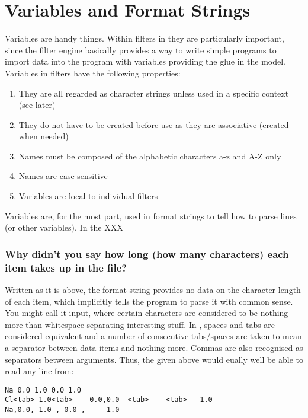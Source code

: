 \chapter{Variables and Format Strings}

Variables are handy things. Within filters in \progname{} they are particularly important, since the filter engine basically provides a way to write simple programs to import data into the program with variables providing the glue in the  model. Variables in filters have the following properties:

\begin{enumerate}
	\item They are all regarded as character strings unless used in a specific context (see later)
	\item They do not have to be created before use as they are associative (created when needed)
	\item Names must be composed of the alphabetic characters a-z and A-Z only
	\item Names are case-sensitive
	\item Variables are local to individual filters
\end{enumerate}

Variables are, for the most part, used in format strings to tell \progname{} how to parse lines (or other variables). In the XXX




\subsection{Why didn't you say how long (how many characters) each item takes up in the file?}

Written as it is above, the format string provides no data on the character length of each item, which implicitly tells the program to parse it with common sense. You might call it  input, where certain characters are considered to be nothing more than whitespace separating interesting stuff. In \progname{}, spaces and tabs are considered equivalent and a number of consecutive tabs/spaces are taken to mean a separator between data items and nothing more. Commas are also recognised as separators between arguments. Thus, the  given above would eually well be able to read any line from:

\begin{verbatim}
Na 0.0 1.0 0.0 1.0
Cl<tab>	1.0<tab>	0.0,0.0  <tab>    <tab>  -1.0
Na,0.0,-1.0 , 0.0 ,     1.0
\end{verbatim}

